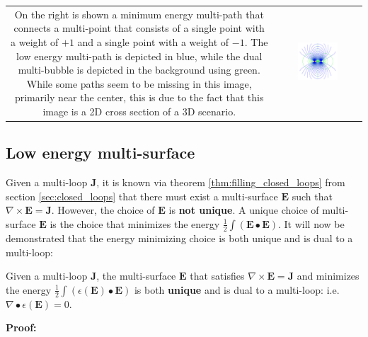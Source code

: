 \begin{tabular}{cc}
\parbox{0.5\textwidth}{
On the right is shown a minimum energy multi-path that connects a multi-point that consists of a single point with a weight of \(+1\) and a single point with a weight of \(-1\). The low energy multi-path is depicted in blue, while the dual multi-bubble is depicted in the background using green. While some paths seem to be missing in this image, primarily near the center, this is due to the fact that this image is a 2D cross section of a 3D scenario.
} & \parbox{0.5\textwidth}{
\includegraphics[width = 0.5\textwidth]{Duality/primary_multi-path_with_simple_balanced_multi-point_3}
}
\end{tabular}




\subsection{Low energy multi-surface}

Given a multi-loop \(\mathbf{J}\), it is known via theorem \ref{thm:filling_closed_loops} from section \ref{sec:closed_loops} that there must exist a multi-surface \(\mathbf{E}\) such that \(\nabla \times \mathbf{E} = \mathbf{J}\). However, the choice of \(\mathbf{E}\) is {\bf not unique}. A unique choice of multi-surface \(\mathbf{E}\) is the choice that minimizes the energy \(\frac{1}{2}\int (\mathbf{E} \bullet \mathbf{E})\). It will now be demonstrated that the energy minimizing choice is both unique and is dual to a multi-loop:

\begin{thm}\label{thm:low_energy_surface}
Given a multi-loop \(\mathbf{J}\), the multi-surface \(\mathbf{E}\) that satisfies \(\nabla \times \mathbf{E} = \mathbf{J}\) and minimizes the energy \(\frac{1}{2}\int (\epsilon(\mathbf{E}) \bullet \mathbf{E})\) is both {\bf unique} and is dual to a multi-loop: i.e. \(\nabla \bullet \epsilon(\mathbf{E}) = 0\). 
\end{thm}
\textbf{Proof:}

